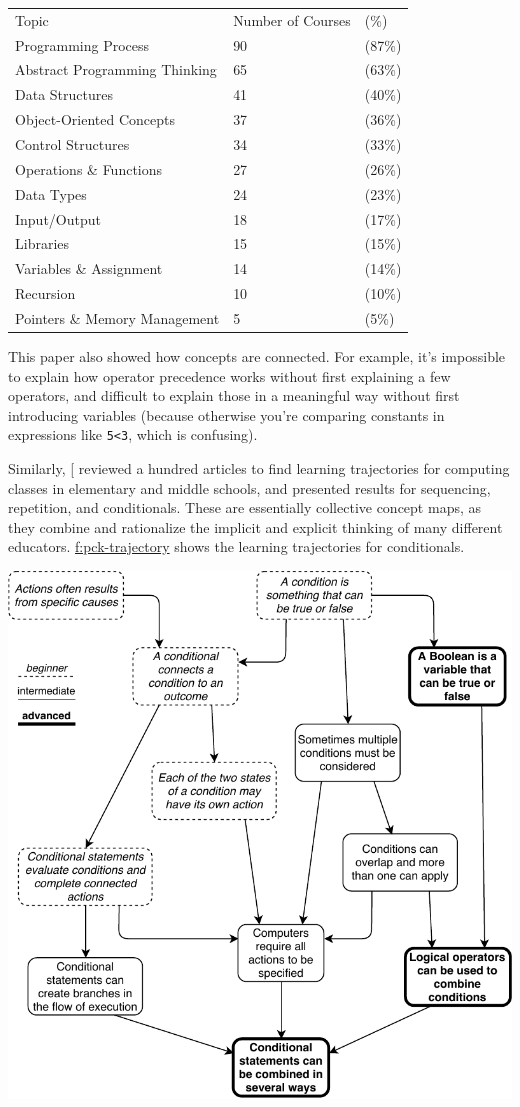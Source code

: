\begin{longtable}[]{@{}lll@{}}
\toprule
Topic & Number of Courses & (\%)\tabularnewline
Programming Process & 90 & (87\%)\tabularnewline
Abstract Programming Thinking & 65 & (63\%)\tabularnewline
Data Structures & 41 & (40\%)\tabularnewline
Object-Oriented Concepts & 37 & (36\%)\tabularnewline
Control Structures & 34 & (33\%)\tabularnewline
Operations \& Functions & 27 & (26\%)\tabularnewline
Data Types & 24 & (23\%)\tabularnewline
Input/Output & 18 & (17\%)\tabularnewline
Libraries & 15 & (15\%)\tabularnewline
Variables \& Assignment & 14 & (14\%)\tabularnewline
Recursion & 10 & (10\%)\tabularnewline
Pointers \& Memory Management & 5 & (5\%)\tabularnewline
\bottomrule
\end{longtable}

This paper also showed how concepts are connected. For example, it's
impossible to explain how operator precedence works without first
explaining a few operators, and difficult to explain those in a
meaningful way without first introducing variables (because otherwise
you're comparing constants in expressions like \texttt{5\textless{}3}, which is
confusing).

Similarly, {[}\protect[\hyperlink{b:Rich2017}{Rich2017}]{]} reviewed a hundred articles to find
learning trajectories for computing classes in elementary and middle
schools, and presented results for sequencing, repetition, and
conditionals. These are essentially collective concept maps, as they
combine and rationalize the implicit and explicit thinking of many
different educators. \protect\hyperlink{FIGURE}{f:pck-trajectory} shows the learning
trajectories for conditionals.

\includegraphics{../../files/conditionals.pdf}

